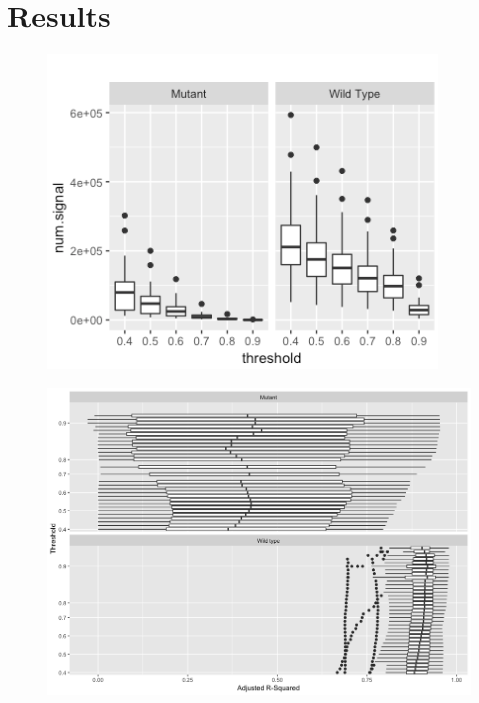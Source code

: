 \documentclass[10pt,letterpaper]{article}
\begin{document}
\section{Results}\label{results}

\begin{figure}[H]
\includegraphics[width=0.9\linewidth]{visualization_paper/thresh_numsig_boxplot} \end{figure}

\begin{figure}[H]
\includegraphics[width=0.9\linewidth]{visualization_paper/threshold_boxplot} \end{figure}
\end{document}
